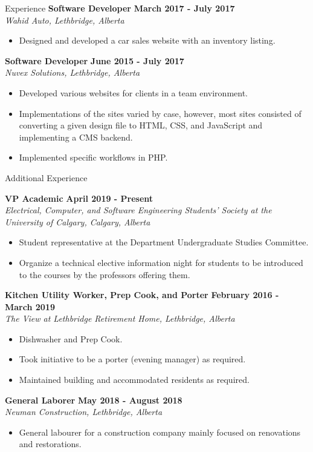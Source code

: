 \documentclass{resume} %
\begin{document}
\begin{Entry}{Experience}
{\bf Software Developer} \hfill {\bf March 2017 - July 2017}
\\{\em Wahid Auto, Lethbridge, Alberta}
\begin{itemize} \itemsep -5pt
    \item Designed and developed a car sales website with an inventory listing. 
\end{itemize}
\clearpage
{\bf Software Developer} \hfill {\bf June 2015 - July 2017}
\\{\em Nuvex Solutions, Lethbridge, Alberta}
\begin{itemize} \itemsep -5pt
    \item Developed various websites for clients in a team environment.
    \item Implementations of the sites varied by case, however, most sites consisted of converting a given design file to HTML, CSS, and JavaScript and implementing a CMS backend.
    \item Implemented specific workflows in PHP.
\end{itemize}
\end{Entry}


\begin{Entry}{Additional Experience}

{\bf VP Academic} \hfill {\bf April 2019 - Present}
\\{\em Electrical, Computer, and Software Engineering Students' Society at the University of Calgary, Calgary, Alberta}
\begin{itemize} \itemsep -5pt
    \item Student representative at the Department Undergraduate Studies Committee. 
    \item Organize a technical elective information night for students to be introduced to the courses by the professors offering them.
\end{itemize}

{\bf Kitchen Utility Worker, Prep Cook, and Porter} \hfill {\bf February 2016 - March 2019}
\\{\em The View at Lethbridge Retirement Home, Lethbridge, Alberta}
\begin{itemize} \itemsep -5pt
    \item Dishwasher and Prep Cook.
    \item Took initiative to be a porter (evening manager) as required. 
    \item Maintained building and accommodated residents as required.
\end{itemize}

{\bf General Laborer} \hfill {\bf May 2018 - August 2018}
\\{\em Neuman Construction, Lethbridge, Alberta}
\begin{itemize} \itemsep -5pt
    \item General labourer for a construction company mainly focused on renovations and restorations.
\end{itemize}
\end{Entry}
\end{document}
